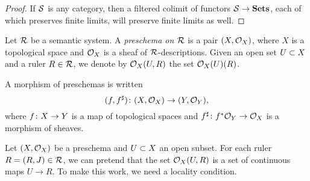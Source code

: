 \documentclass{amsart}
\begin{document}
\begin{proof}

If $\mcS$ is any category, then a filtered colimit of functors $\mcS\to\Sets$, each of which preserves finite limits, will preserve finite limits as well.

\end{proof}

\begin{definition}

Let $\mcR$ be a semantic system.  A {\em preschema on $\mcR$} is a pair $(X,\mcO_X)$, where $X$ is a topological space and $\mcO_X$ is a sheaf of $\mcR$-descriptions.  Given an open set $U\ss X$ and a ruler $R\in\mcR$, we denote by $\mcO_X(U,R)$ the set $\mcO_X(U)(R)$.  

A morphism of preschemas is written $$(f,f^\sharp)\taking(X,\mcO_X)\to(Y,\mcO_Y),$$ where $f\taking X\to Y$ is a map of topological spaces and $f^\sharp\taking f^*\mcO_Y\to\mcO_X$ is a morphism of sheaves.

\end{definition}

Let $(X,\mcO_X)$ be a preschema and $U\ss X$ an open subset. For each ruler $R=(R,J)\in\mcR$, we can pretend that the set $\mcO_X(U,R)$ is a set of continuous maps $U\to R$.   To make this work, we need a locality condition.
\end{document}
